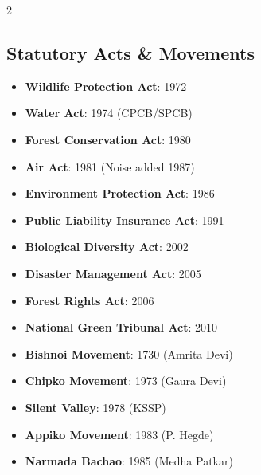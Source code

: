 \begin{multicols}{2}
\subsection*{Statutory Acts \& Movements}
\begin{itemize}[leftmargin=1.2em]
    \item \textbf{Wildlife Protection Act}: 1972
    \item \textbf{Water Act}: 1974 (CPCB/SPCB)
    \item \textbf{Forest Conservation Act}: 1980
    \item \textbf{Air Act}: 1981 (Noise added 1987)
    \item \textbf{Environment Protection Act}: 1986
    \item \textbf{Public Liability Insurance Act}: 1991
    \item \textbf{Biological Diversity Act}: 2002
    \item \textbf{Disaster Management Act}: 2005
    \item \textbf{Forest Rights Act}: 2006
    \item \textbf{National Green Tribunal Act}: 2010
    \item \textbf{Bishnoi Movement}: 1730 (Amrita Devi)
    \item \textbf{Chipko Movement}: 1973 (Gaura Devi)
    \item \textbf{Silent Valley}: 1978 (KSSP)
    \item \textbf{Appiko Movement}: 1983 (P. Hegde)
    \item \textbf{Narmada Bachao}: 1985 (Medha Patkar)
\end{itemize}
\end{multicols}

\newpage
